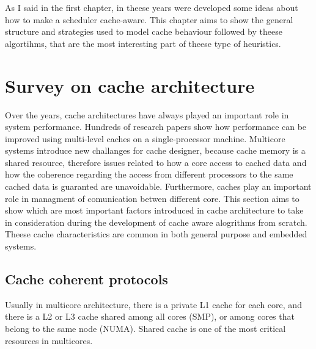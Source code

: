 As I said in the first chapter, in theese years were developed some ideas about how to make a scheduler cache-aware.
This chapter aims to show the general structure and strategies used to model cache behaviour followed by theese algortihms, that are the most interesting 
part of theese type of heuristics.

\section{Survey on cache architecture}
\label{sec:s1}

Over the years, cache architectures have always played an important role in system performance. Hundreds of research papers show how performance
can be improved using multi-level caches on a single-processor machine. Multicore systems introduce new challanges for cache designer, because cache memory 
is a shared resource, therefore issues related to how a core access to cached data and how the coherence regarding the access from different processors 
to the same cached data is guaranted are unavoidable. Furthermore, caches play an important role in managment of comunication betwen different core.
This section aims to show which are most important factors introduced in cache architecture to take in consideration during the development of cache aware
alogrithms from scratch. Theese cache characteristics are common in both general purpose and embedded systems.

\subsection{Cache coherent protocols}

Usually in multicore architecture, there is a private L1 cache for each core, and there is a L2 or L3 cache shared among all cores (SMP), or among cores 
that belong to the same node (NUMA). Shared cache is one of the most critical resources in multicores.

